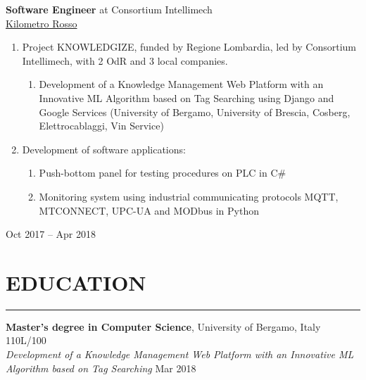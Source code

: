 \documentclass[10pt]{article}
\newcommand{\cvsection}[1]{\section*{\centering\normalsize\uppercase{#1}}\vspace{-16pt}\rule{\linewidth}{0.2pt}\vspace{6pt}}
\begin{document}
\vspace{20pt} %

\noindent
\begin{minipage}[t]{.8\textwidth}
	\raggedright
	\textbf{Software Engineer} at Consortium Intellimech\\
	\href{https://www.linkedin.com/company/kilometro-rosso/}{Kilometro Rosso}
	\vspace{6pt}
	\begin{enumerate}
		\item Project KNOWLEDGIZE, funded by Regione Lombardia, led by Consortium Intellimech, with 2 OdR and 3 local companies.
		  \begin{enumerate}
			\item Development of a Knowledge Management Web Platform with an Innovative ML Algorithm based on Tag Searching using Django and Google Services (University of Bergamo, University of Brescia, Cosberg, Elettrocablaggi, Vin Service)
		\end{enumerate}
		\item Development of software applications:
		  \begin{enumerate}
			\item Push-bottom panel for testing procedures on PLC in C\#
			\item Monitoring system using industrial communicating protocols MQTT, MTCONNECT, UPC-UA and MODbus in Python
		\end{enumerate}
  \end{enumerate}
\end{minipage}%
\hfill\vrule\hfill
\begin{minipage}[t]{.16\textwidth}
	\raggedleft
	Oct 2017 – Apr 2018
\end{minipage}

\clearpage
\pagestyle{fancy}


\cvsection{education}
\textbf{Master's degree in Computer Science}, University of Bergamo, Italy \hfill 110L\slash100 \\
\textit{Development of a Knowledge Management Web Platform with an Innovative ML Algorithm based on Tag Searching} \hfill Mar 2018
\end{document}
